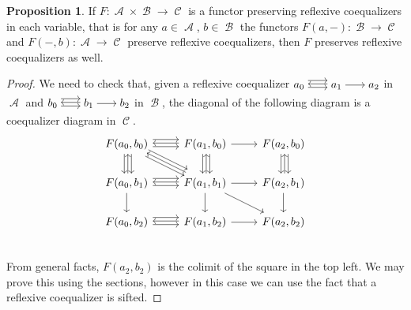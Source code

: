 \documentclass[a4paper,11pt,oneside,openany]{scrbook}
\DeclareMathOperator{\A}{\mathcal{A}}
\DeclareMathOperator{\B}{\mathcal{B}}
\DeclareMathOperator{\C}{\mathcal{C}}
\theoremstyle{definition}
\theoremstyle{definition}
\newtheorem{prop}[thm]{Proposition}
\begin{document}
\begin{prop}
	If $F\colon\A\times\B\rightarrow\C$ is a functor preserving reflexive coequalizers in each variable, that is for any $a\in\A$, $b\in\B$ the functors $F(a,-)\colon\B\rightarrow\C$ and $F(-,b)\colon\A\rightarrow\C$ preserve reflexive coequalizers, then $F$ preserves reflexive coequalizers as well.
\end{prop}

\begin{proof}
	We need to check that, given a reflexive coequalizer $\hspace{-1.5mm}\begin{tikzcd}
	a_0\hspace{-1.5mm}\arrow[r, shift right=.5ex, shorten <= .3em, shorten >= .3em]  \arrow[r, shift left=1ex, shorten <= .3em, shorten >= .3em] & \hspace{-1.5mm}a_1\hspace{-1.5mm}\arrow[l, shift right=.25ex, shorten <=.3em, shorten >=.3em]\arrow[r, shorten <= .3em, shorten >= .3em] & \hspace{-1.5mm}a_2
	\end{tikzcd}\hspace{-1.5mm}$ in $\A$ and $\hspace{-1.5mm}\begin{tikzcd}
	b_0\hspace{-1.5mm}\arrow[r, shift right=.5ex, shorten <= .3em, shorten >= .3em]  \arrow[r, shift left=1ex, shorten <= .3em, shorten >= .3em] & \hspace{-1.5mm}b_1\hspace{-1.5mm}\arrow[l, shift right=.25ex, shorten <=.3em, shorten >=.3em]\arrow[r, shorten <= .3em, shorten >= .3em] & \hspace{-1.5mm}b_2
	\end{tikzcd}\hspace{-1.5mm}$ in $\B$, the diagonal of the following diagram is a coequalizer diagram in $\C$.
	\[
	\begin{tikzcd}
		F(a_0,b_0)\ar[r, shift right=.5ex]\ar[r, shift left=1ex]\ar[d, shift right=.5ex]\ar[d, shift left=1ex]\ar[dr, shift right=.5ex]\ar[dr, shift left=1ex]
		& F(a_1,b_0)\ar[d, shift right=.5ex]\ar[d, shift left=1ex]\ar[l, shift right=.25ex]\ar[r]
		& F(a_2,b_0)\ar[d, shift right=.5ex]\ar[d, shift left=1ex] \\
		F(a_0,b_1)\ar[r, shift right=.5ex]\ar[r, shift left=1ex]\ar[u, shift right=.25ex]\ar[d]
		& F(a_1,b_1)\ar[u, shift right=.25ex]\ar[l, shift right=.25ex]\ar[ul, shift right=.25ex]\ar[r]\ar[d]\ar[dr]
		& F(a_2,b_1)\ar[u, shift right=.25ex]\ar[d] \\
		F(a_0,b_2)\ar[r, shift right=.5ex]\ar[r, shift left=1ex]
		& F(a_1,b_2)\ar[l, shift right=.25ex]\ar[r]
		& F(a_2,b_2) \\
	\end{tikzcd}
	\]
	From general facts, $F(a_2,b_2)$ is the colimit of the square in the top left. We may prove this using the sections, however in this case we can use the fact that a reflexive coequalizer is sifted.
\end{proof}
\end{document}
